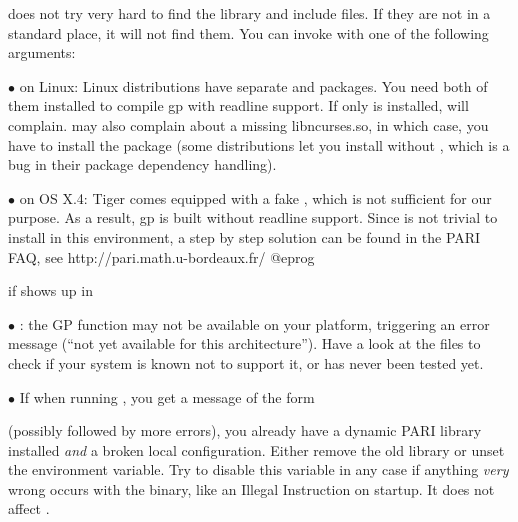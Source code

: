  does not try very hard to find the  library and
include files. If they are not in a standard place, it will not find them.
You can invoke  with one of the following arguments:





$\bullet$ on Linux: Linux distributions have separate  and
 packages. You need both of them installed to
compile gp with readline support. If only  is installed,
 will complain.  may also complain about a
missing libncurses.so, in which case, you have to install the
 package (some distributions let you install
 without , which is a bug in
their package dependency handling).

$\bullet$ on OS X.4: Tiger comes equipped with a fake ,
which is not sufficient for our purpose. As a result, gp is built
without readline support. Since  is not trivial to install
in this environment, a step by step solution can be found in the PARI
FAQ, see
\bprog
  http://pari.math.u-bordeaux.fr/
@eprog


 if  shows up in 

$\bullet$ : the GP function  may not be available on
your platform, triggering an error message (``not yet available for this
architecture''). Have a look at the  files to check if your
system is known not to support it, or has never been tested yet.

$\bullet$ If when running , you get a message of the form


\noindent (possibly followed by more errors), you already have a dynamic PARI
library installed \emph{and} a broken local configuration. Either remove the
old library or unset the  environment variable. Try to
disable this variable in any case if anything \emph{very} wrong occurs with
the  binary, like an Illegal Instruction on startup. It does not
affect .

